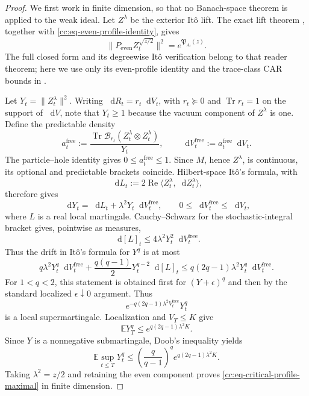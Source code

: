 \documentclass[10pt,reqno]{amsart}
\theoremstyle{plain}
\theoremstyle{definition}
\theoremstyle{remark}
\begin{document}
\begin{proof}
We first work in finite dimension, so that no Banach-space theorem is
applied to the weak ideal.  Let \(Z^\lambda\) be the exterior It\^o lift.
The exact lift theorem
, together with
\eqref{cc:eq-even-profile-identity}, gives
\[
 \|P_{\mathrm{even}}Z_t^{\sqrt{z/2}}\|^2
 =e^{\mathfrak P_{A_t}(z)}.
\]
The full closed form and its degreewise It\^o verification belong to that
reader theorem; here we use only its even-profile identity and the
trace-class CAR bounds in .

Let \(Y_t=\|Z_t^\lambda\|^2\).  Writing
\(\mathop{}\!\mathrm dR_t=r_t\mathop{}\!\mathrm dV_t\), with
\(r_t\succeq0\) and \(\operatorname{Tr}r_t=1\) on the support of
\(\mathop{}\!\mathrm dV\), note that \(Y_t\geq1\) because the vacuum
component of \(Z^\lambda\) is one.  Define the predictable density
\[
 a_t^{\mathrm{free}}
 :=\frac{\operatorname{Tr}\mathcal B_{r_t}
        (Z_t^\lambda\otimes Z_t^\lambda)}{Y_t},
 \qquad
 \mathop{}\!\mathrm dV_t^{\mathrm{free}}
 :=a_t^{\mathrm{free}}\mathop{}\!\mathrm dV_t.
\]
The particle--hole identity gives
\(0\leq a_t^{\mathrm{free}}\leq1\).  Since \(M\), hence
\(Z^\lambda\), is continuous, its optional and predictable brackets
coincide.  Hilbert-space It\^o's formula, with
\[
 \mathop{}\!\mathrm dL_t
 :=2\operatorname{Re}
   \langle Z_t^\lambda,\mathop{}\!\mathrm dZ_t^\lambda\rangle,
\]
therefore gives
\[
 \mathop{}\!\mathrm dY_t
 =\mathop{}\!\mathrm dL_t
   +\lambda^2Y_t\mathop{}\!\mathrm dV_t^{\mathrm{free}},
 \qquad
 0\leq\mathop{}\!\mathrm dV_t^{\mathrm{free}}
 \leq\mathop{}\!\mathrm dV_t,
\]
where \(L\) is a real local martingale.  Cauchy--Schwarz for the
stochastic-integral bracket gives, pointwise as measures,
\[
 \mathop{}\!\mathrm d[L]_t
 \leq4\lambda^2Y_t^2\mathop{}\!\mathrm dV_t^{\mathrm{free}}.
\]
Thus the drift in It\^o's formula for \(Y^q\) is at most
\[
 q\lambda^2Y_t^q\mathop{}\!\mathrm dV_t^{\mathrm{free}}
 +\frac{q(q-1)}2Y_t^{q-2}\mathop{}\!\mathrm d[L]_t
 \leq q(2q-1)\lambda^2Y_t^q
       \mathop{}\!\mathrm dV_t^{\mathrm{free}}.
\]
For \(1<q<2\), this statement is obtained first for
\((Y+\epsilon)^q\) and then by the standard localized
\(\epsilon\downarrow0\) argument.
Thus
\[
 e^{-q(2q-1)\lambda^2V_t^{\mathrm{free}}}Y_t^q
\]
is a local supermartingale.  Localization and \(V_T\leq K\) give
\[
 \mathbb EY_T^q\leq e^{q(2q-1)\lambda^2K}.
\]
Since \(Y\) is a nonnegative submartingale, Doob's inequality yields
\[
 \mathbb E\sup_{t\leq T}Y_t^q
 \leq\left(\frac q{q-1}\right)^q
 e^{q(2q-1)\lambda^2K}.
\]
Taking \(\lambda^2=z/2\) and retaining the even component proves
\eqref{cc:eq-critical-profile-maximal} in finite dimension.


\end{proof}
\end{document}

